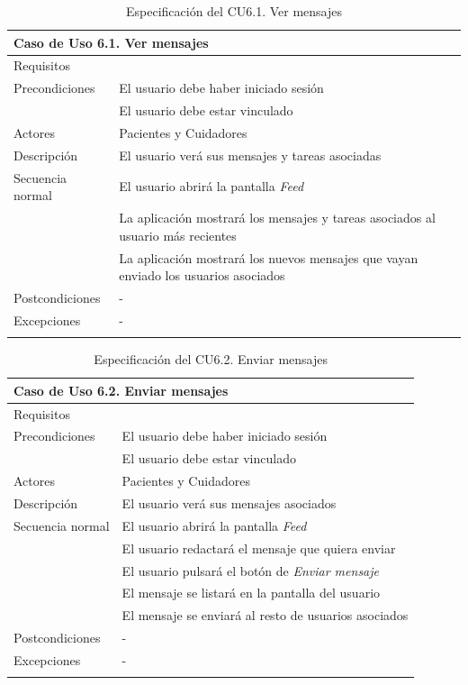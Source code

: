 \begin{longtable}{|p{} p{}|}
    \hline
    \multicolumn{2}{|l|}{\textbf{Caso de Uso 6.1. Ver mensajes}} \\ \hline \hline
    Requisitos          & {req:listar_mensaje} \\ \hline
    Precondiciones      & El usuario debe haber iniciado sesión \\
                        & El usuario debe estar vinculado \\ \hline
    Actores             & Pacientes y Cuidadores \\ \hline
    Descripción         & El usuario verá sus mensajes y tareas asociadas \\ \hline
    Secuencia normal    & El usuario abrirá la pantalla \emph{Feed} \\
                        & La aplicación mostrará los mensajes y tareas asociados al usuario más recientes \\ 
                        & La aplicación mostrará los nuevos mensajes que vayan enviado los usuarios asociados \\ \hline
    Postcondiciones     & - \\ \hline
    Excepciones         & - \\ \hline
    \caption{Especificación del CU6.1. Ver mensajes}
    \label{cu:ver_mensajes}
\end{longtable}

\begin{longtable}{|p{} p{}|}
    \hline
    \multicolumn{2}{|l|}{\textbf{Caso de Uso 6.2. Enviar mensajes}} \\ \hline \hline
    Requisitos          & {req:envio_mensaje} \\ \hline
    Precondiciones      & El usuario debe haber iniciado sesión \\
                        & El usuario debe estar vinculado \\ \hline
    Actores             & Pacientes y Cuidadores \\ \hline
    Descripción         & El usuario verá sus mensajes asociados \\ \hline
    Secuencia normal    & El usuario abrirá la pantalla \emph{Feed} \\
                        & El usuario redactará el mensaje que quiera enviar \\
                        & El usuario pulsará el botón de \emph{Enviar mensaje} \\
                        & El mensaje se listará en la pantalla del usuario \\
                        & El mensaje se enviará al resto de usuarios asociados \\ \hline
    Postcondiciones     & - \\ \hline
    Excepciones         & - \\ \hline
    \caption{Especificación del CU6.2. Enviar mensajes}
    \label{cu:enviar_mensajes}
\end{longtable}

